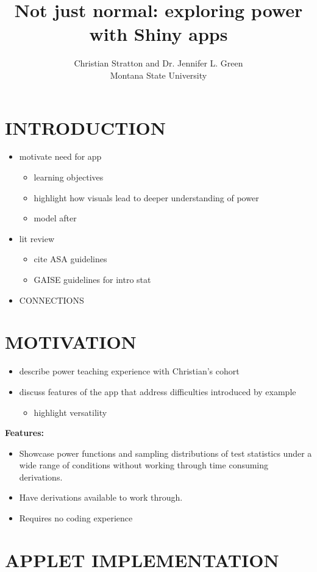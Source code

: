 \documentclass{TISE}
\title{Not just normal: exploring power with Shiny apps}
\author{Christian Stratton and Dr. Jennifer L. Green \\ Montana State University}
\begin{document}
	
\section{INTRODUCTION}

\begin{itemize}
	\item motivate need for app
	\begin{itemize}
		\item learning objectives
		\item highlight how visuals lead to deeper understanding of power
		\item model after \cite{mcdaniel2012}
	\end{itemize}
	\item lit review
	\begin{itemize}
		\item cite ASA guidelines
		\item GAISE guidelines for intro stat
	\end{itemize}
	\item CONNECTIONS
\end{itemize}

\section{MOTIVATION}

\begin{itemize}
	\item describe power teaching experience with Christian's cohort
	\item discuss features of the app that address difficulties introduced by example
	\begin{itemize}
		\item highlight versatility
	\end{itemize}
\end{itemize}

\textbf{Features:}
\begin{itemize}
	\item Showcase power functions and sampling distributions of test statistics under a wide range of conditions without working through time consuming derivations.
	\item Have derivations available to work through.
	\item Requires no coding experience
\end{itemize}

\section{APPLET IMPLEMENTATION}
\end{document}
